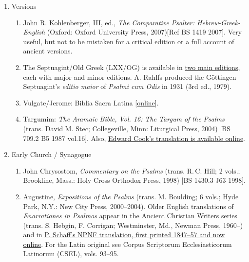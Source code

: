 \documentclass[titlepage]{article}
\begin{document}
\begin{enumerate}

 \item Versions
  \begin{enumerate}

	\item John R. Kohlenberger, III, ed., \emph{The Comparative Psalter: Hebrew-Greek-English} (Oxford: Oxford University Press, 2007)[Ref BS 1419 2007]. Very useful, but not to be mistaken for a critical edition or a full account of ancient versions.

	\item The Septuagint/Old Greek (LXX/OG) is available in \href{http://ccat.sas.upenn.edu/ioscs/editions.html}{two main editions}, each with major and minor editions. A. Rahlfs produced the Göttingen Septuagint's \emph{editio maior} of \emph{Psalmi cum Odis} in 1931 (3rd ed., 1979).

	\item Vulgate/Jerome: Biblia Sacra Latina [\href{https://www.biblegateway.com/versions/?action=getVersionInfo&vid=4}{online}].

	\item Targumim: \emph{The Aramaic Bible, Vol. 16: The Targum of the Psalms} (trans. David M. Stec; Collegeville, Minn: Liturgical Press, 2004) [BS 709.2 B5 1987 vol.16]. Also, \href{http://targum.info/targumic-texts/targum-psalms/}{Edward Cook's translation is available online}.

  \end{enumerate}
 \item Early Church / Synagogue
  \begin{enumerate}

	\item John Chrysostom, \emph{Commentary on the Psalms} (trans. R.\,C. Hill; 2 vols.; Brookline, Mass.: Holy Cross Orthodox Press, 1998) [BS 1430.3 J63 1998].

	\item Augustine, \emph{Expositions of the Psalms} (trans. M. Boulding; 6 vols.; Hyde Park, N.Y.: New City Press, 2000--2004). Older English translations of \emph{Enarrationes in Psalmos} appear in the Ancient Christian Writers series (trans. S. Hebgin, F. Corrigan; Westminster, Md., Newman Press, 1960--) and in \href{http://www.ccel.org/ccel/schaff/npnf108.toc.html}{P. Schaff's NPNF translation, first printed 1847--57 and now online}. For the Latin original see Corpus Scriptorum Ecclesiasticorum Latinorum (CSEL), vols. 93--95.


\end{enumerate}
\end{enumerate}
\end{document}
